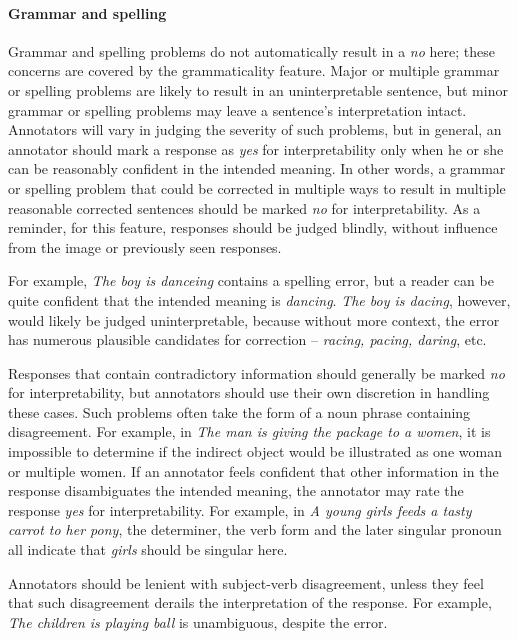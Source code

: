 \documentclass[12pt,notitlepage]{article}
\begin{document}
\paragraph{Grammar and spelling} \label{para:interp-grammar} Grammar and spelling problems do not automatically result in a \textit{no} here; these concerns are covered by the grammaticality feature. Major or multiple grammar or spelling problems are likely to result in an uninterpretable sentence, but minor grammar or spelling problems may leave a sentence's interpretation intact. Annotators will vary in judging the severity of such problems, but in general, an annotator should mark a response as \textit{yes} for interpretability only when he or she can be reasonably confident in the intended meaning. In other words, a grammar or spelling problem that could be corrected in multiple ways to result in multiple reasonable corrected sentences should be marked \textit{no} for interpretability. As a reminder, for this feature, responses should be judged blindly, without influence from the image or previously seen responses.

For example, \textit{The boy is danceing} contains a spelling error, but a reader can be quite confident that the intended meaning is \textit{dancing}. \textit{The boy is dacing}, however, would likely be judged uninterpretable, because without more context, the error has numerous plausible candidates for correction -- \textit{racing, pacing, daring}, etc.

Responses that contain contradictory information should generally be marked \textit{no} for interpretability, but annotators should use their own discretion in handling these cases. Such problems often take the form of a noun phrase containing disagreement. For example, in \textit{The man is giving the package to a women}, it is impossible to determine if the indirect object would be illustrated as one woman or multiple women. If an annotator feels confident that other information in the response disambiguates the intended meaning, the annotator may rate the response \textit{yes} for interpretability. For example, in \textit{A young girls feeds a tasty carrot to her pony}, the determiner, the verb form and the later singular pronoun all indicate that \textit{girls} should be singular here.

Annotators should be lenient with subject-verb disagreement, unless they feel that such disagreement derails the interpretation of the response. For example, \textit{The children is playing ball} is unambiguous, despite the error.
\end{document}
